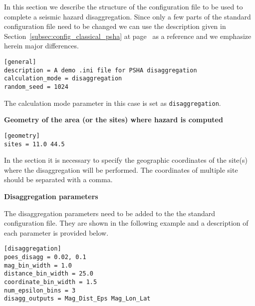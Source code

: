 In this section we describe the structure of the configuration file to be used
to complete a seismic hazard disaggregation. Since only a few parts of the
standard configuration file need to be changed we can use the description
given in Section~\ref{subsec:config_classical_psha} at
page~\pageref{subsec:config_classical_psha} as a reference and we emphasize
herein major differences.

\begin{verbatim}
[general]
description = A demo .ini file for PSHA disaggregation
calculation_mode = disaggregation
random_seed = 1024
\end{verbatim}

The calculation mode parameter in this case is set as
\texttt{disaggregation}.

\textbf{Geometry of the area (or the sites) where hazard is computed}

\begin{verbatim}
[geometry]
sites = 11.0 44.5
\end{verbatim}

In the section it is necessary to specify the geographic coordinates of
the site(s) where the disaggregation will be performed. The coordinates
of multiple site should be separated with a comma.

\textbf{Disaggregation parameters}

The disaggregation parameters need to be added to the the standard
configuration file. They are shown in the following example and a description
of each parameter is provided below.

\begin{verbatim}
[disaggregation]
poes_disagg = 0.02, 0.1
mag_bin_width = 1.0
distance_bin_width = 25.0
coordinate_bin_width = 1.5
num_epsilon_bins = 3
disagg_outputs = Mag_Dist_Eps Mag_Lon_Lat
\end{verbatim}

